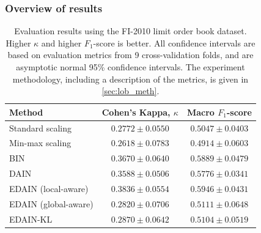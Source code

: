 \documentclass{statsmsc}
\begin{document}
{\subsubsection{Overview of results}%
\label{ssub:Overview of results}

\begin{table}[htp]
    \centering
    \begin{tabular}{lcc}
        \toprule
        Method & Cohen's Kappa, $\kappa$ & Macro $F_1$-score \\
        \midrule
        Standard scaling & $0.2772 \pm 0.0550$ & $0.5047 \pm 0.0403$ \\
        Min-max scaling & $0.2618 \pm 0.0783$ & $0.4914 \pm 0.0603$ \\
        BIN & $0.3670 \pm 0.0640$ & $0.5889 \pm 0.0479$ \\
        DAIN & $0.3588 \pm 0.0506$ & $0.5776 \pm 0.0341$ \\
        EDAIN (local-aware) & $\bm{0.3836 \pm 0.0554}$ & $\bm{0.5946 \pm 0.0431}$ \\
        EDAIN (global-aware) & $0.2820 \pm 0.0706$ & $0.5111 \pm 0.0648$ \\
        EDAIN-KL & $0.2870 \pm 0.0642$ & $0.5104 \pm 0.0519$ \\
        \bottomrule
    \end{tabular}%
    \caption{
        Evaluation results using the FI-2010 limit order book dataset.
        Higher $\kappa$ and higher $F_1$-score is better.
        All confidence intervals are based on evaluation metrics from 9 cross-validation folds,
        and are asymptotic normal 95\% confidence intervals.
        The experiment methodology, including a description of the metrics,
        is given in  \cref{sec:lob_meth}.
    }%
    \label{tab:lob_performance}%
\end{table}

}
\end{document}
